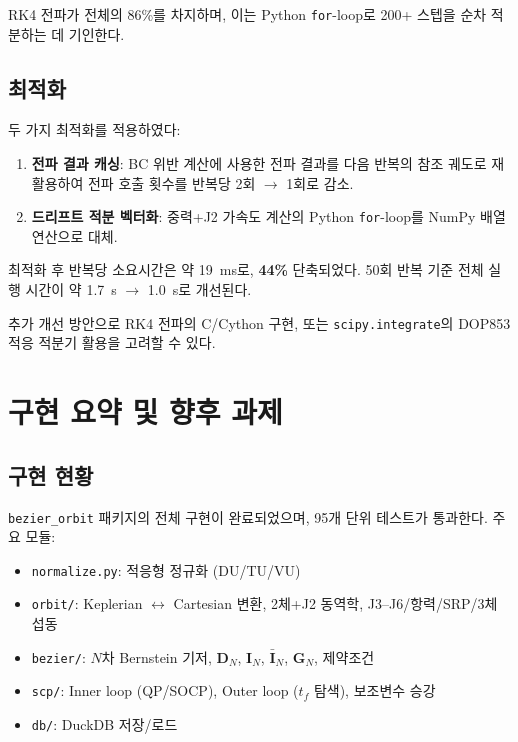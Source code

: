 \documentclass[11pt]{article}
\begin{document}
RK4 전파가 전체의 86\%를 차지하며, 이는 Python \texttt{for}-loop로
200+ 스텝을 순차 적분하는 데 기인한다.

\subsection{최적화}

두 가지 최적화를 적용하였다:
\begin{enumerate}
  \item \textbf{전파 결과 캐싱}: BC 위반 계산에 사용한 전파 결과를
        다음 반복의 참조 궤도로 재활용하여 전파 호출 횟수를
        반복당 2회 $\to$ 1회로 감소.
  \item \textbf{드리프트 적분 벡터화}: 중력+J2 가속도 계산의 Python
        \texttt{for}-loop를 NumPy 배열 연산으로 대체.
\end{enumerate}

최적화 후 반복당 소요시간은 약 \SI{19}{\ms}로, \textbf{44\%} 단축되었다.
50회 반복 기준 전체 실행 시간이 약 \SI{1.7}{\s} $\to$ \SI{1.0}{\s}로 개선된다.

추가 개선 방안으로 RK4 전파의 C/Cython 구현, 또는 \texttt{scipy.integrate}의
DOP853 적응 적분기 활용을 고려할 수 있다.

\section{구현 요약 및 향후 과제}
\label{sec:summary}

\subsection{구현 현황}

\texttt{bezier\_orbit} 패키지의 전체 구현이 완료되었으며, 95개 단위 테스트가 통과한다.
주요 모듈:
\begin{itemize}
  \item \texttt{normalize.py}: 적응형 정규화 (DU/TU/VU)
  \item \texttt{orbit/}: Keplerian $\leftrightarrow$ Cartesian 변환, 2체+J2 동역학, J3--J6/항력/SRP/3체 섭동
  \item \texttt{bezier/}: $N$차 Bernstein 기저, $\mathbf{D}_N$, $\mathbf{I}_N$, $\bar{\mathbf{I}}_N$, $\mathbf{G}_N$, 제약조건
  \item \texttt{scp/}: Inner loop (QP/SOCP), Outer loop ($t_f$ 탐색), 보조변수 승강
  \item \texttt{db/}: DuckDB 저장/로드
\end{itemize}
\end{document}
